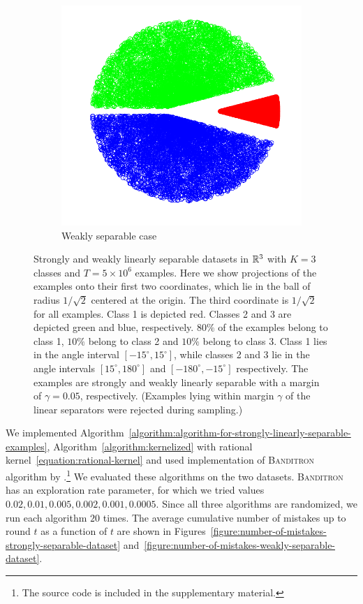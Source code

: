 \begin{figure}[h]
\begin{subfigure}[b]{0.3\textwidth}
\includegraphics[width=\textwidth, trim={0, 0cm, 0, 0}, clip]{figures/weak_points}
\caption{Weakly separable case}
\label{figure:weakly-separable-dataset}
\end{subfigure}
\caption{Strongly and weakly linearly separable datasets in $\mathbb{R}^3$ with $K=3$
classes and $T=5\times 10^6$ examples. Here we show projections of the examples
onto their first two coordinates, which lie in the ball of radius $1/\sqrt{2}$
centered at the origin. The third coordinate is $1/\sqrt{2}$ for all examples.
Class 1 is depicted red. Classes 2 and 3 are depicted green and blue,
respectively. $80\%$ of the examples belong to class 1, $10\%$ belong to class 2
and $10\%$ belong to class 3. Class 1 lies in the angle interval $[-15^\circ,
15^\circ]$, while classes 2 and 3 lie in the angle intervals $[15^\circ,
180^\circ]$ and $[-180^\circ, -15^\circ]$ respectively. The examples are
strongly and weakly linearly separable with a margin of $\gamma=0.05$,
respectively. (Examples lying within margin $\gamma$ of the linear separators
were rejected during sampling.)}
\label{figure:strongly-and-weakly-separable-datasets}
\end{figure}

We implemented
Algorithm~\ref{algorithm:algorithm-for-strongly-linearly-separable-examples},
Algorithm~\ref{algorithm:kernelized} with rational
kernel~\eqref{equation:rational-kernel} and used implementation of
\textsc{Banditron} algorithm by \citet{Orabona09}.\footnote{The source code
is included in the supplementary material.}
We evaluated these algorithms on the two datasets. \textsc{Banditron} has an
exploration rate parameter, for which we tried values $0.02, 0.01, 0.005, 0.002,
0.001, 0.0005$. Since all three algorithms are randomized, we run each algorithm
$20$ times. The average cumulative number of mistakes up to round $t$ as a
function of $t$ are shown in
Figures~\ref{figure:number-of-mistakes-strongly-separable-dataset}
and~\ref{figure:number-of-mistakes-weakly-separable-dataset}.

